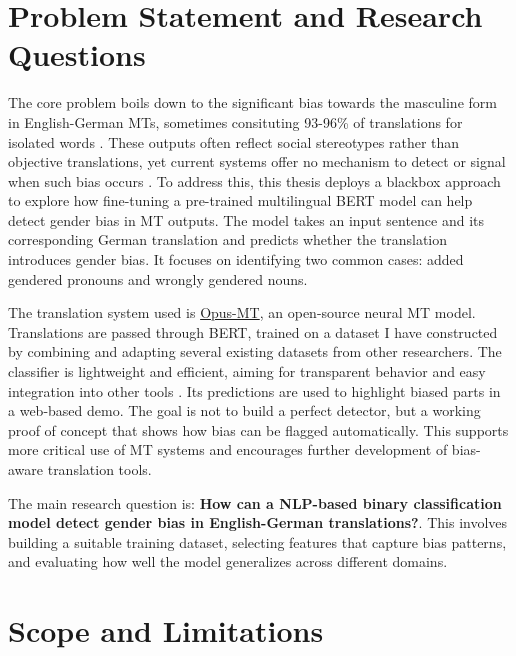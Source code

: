 \section{Problem Statement and Research Questions}

The core problem boils down to the significant bias towards the masculine form in English-German MTs, sometimes consituting 93-96\% of translations for isolated words \citep{lardelliBuildingBridgesDataset2024}. These outputs often reflect social stereotypes rather than objective translations, yet current systems offer no mechanism to detect or signal when such bias occurs \citep{rescignoGenderBiasMachine2023}. To address this, this thesis deploys a blackbox approach to explore how fine-tuning a pre-trained multilingual BERT model can help detect gender bias in MT outputs. The model takes an input sentence and its corresponding German translation and predicts whether the translation introduces gender bias. It focuses on identifying two common cases: added gendered pronouns and wrongly gendered nouns.

The translation system used is \href{https://github.com/Helsinki-NLP/Opus-MT?tab=readme-ov-file}{Opus-MT}, an open-source neural MT model. %
Translations are passed through BERT, trained on a dataset I have constructed by combining and adapting several existing datasets from other researchers. The classifier is lightweight and efficient, aiming for transparent behavior and easy integration into other tools \citep{devlinBERTPretrainingDeep2019}. Its predictions are used to highlight biased parts in a web-based demo. The goal is not to build a perfect detector, but a working proof of concept that shows how bias can be flagged automatically. This supports more critical use of MT systems and encourages further development of bias-aware translation tools.

The main research question is: \textbf{How can a NLP-based binary classification model detect gender bias in English-German translations?}. This involves building a suitable training dataset, selecting features that capture bias patterns, and evaluating how well the model generalizes across different domains.

\section{Scope and Limitations}

